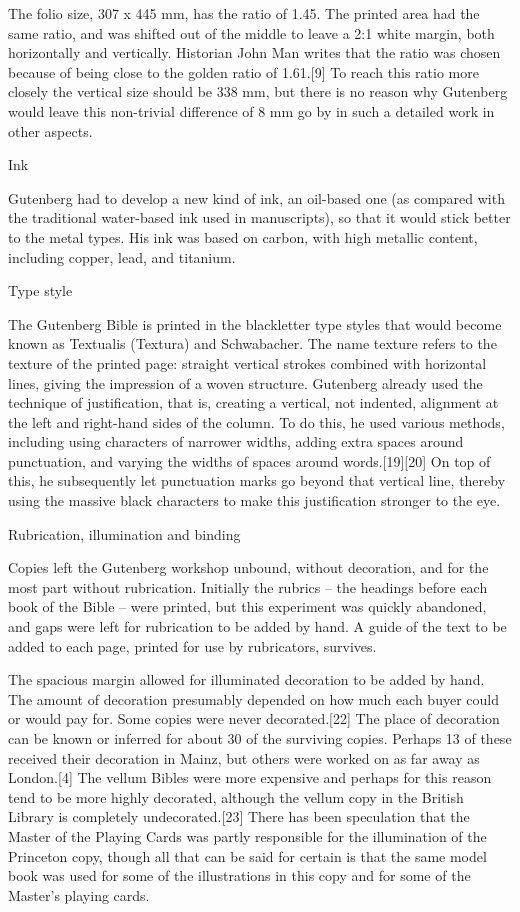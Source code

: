 {{{The folio size, 307 x 445 mm, has the ratio of 1.45. The printed area had the same ratio, and was shifted out of the middle to leave a 2:1 white margin, both horizontally and vertically. Historian John Man writes that the ratio was chosen because of being close to the golden ratio of 1.61.[9] To reach this ratio more closely the vertical size should be 338 mm, but there is no reason why Gutenberg would leave this non-trivial difference of 8 mm go by in such a detailed work in other aspects.

Ink

Gutenberg had to develop a new kind of ink, an oil-based one (as compared with the traditional water-based ink used in manuscripts), so that it would stick better to the metal types. His ink was based on carbon, with high metallic content, including copper, lead, and titanium.

Type style

The Gutenberg Bible is printed in the blackletter type styles that would become known as Textualis (Textura) and Schwabacher. The name texture refers to the texture of the printed page: straight vertical strokes combined with horizontal lines, giving the impression of a woven structure. Gutenberg already used the technique of justification, that is, creating a vertical, not indented, alignment at the left and right-hand sides of the column. To do this, he used various methods, including using characters of narrower widths, adding extra spaces around punctuation, and varying the widths of spaces around words.[19][20] On top of this, he subsequently let punctuation marks go beyond that vertical line, thereby using the massive black characters to make this justification stronger to the eye.


Rubrication, illumination and binding

Copies left the Gutenberg workshop unbound, without decoration, and for the most part without rubrication.
Initially the rubrics -- the headings before each book of the Bible -- were printed, but this experiment was quickly abandoned, and gaps were left for rubrication to be added by hand. A guide of the text to be added to each page, printed for use by rubricators, survives.\cite{Kapr1996}

The spacious margin allowed for illuminated decoration to be added by hand. The amount of decoration presumably depended on how much each buyer could or would pay for. Some copies were never decorated.[22] The place of decoration can be known or inferred for about 30 of the surviving copies. Perhaps 13 of these received their decoration in Mainz, but others were worked on as far away as London.[4] The vellum Bibles were more expensive and perhaps for this reason tend to be more highly decorated, although the vellum copy in the British Library is completely undecorated.[23] There has been speculation that the Master of the Playing Cards was partly responsible for the illumination of the Princeton copy, though all that can be said for certain is that the same model book was used for some of the illustrations in this copy and for some of the Master's playing cards.\cite{Buren1974}

}}}

